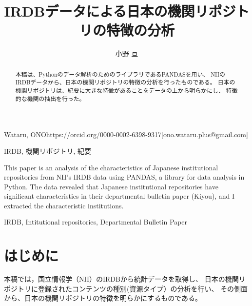 \documentclass[submit,noauthor]{ono}
\begin{document}
\title{IRDBデータによる日本の機関リポジトリの特徴の分析\\}



\author{小野 亘}{Wataru, ONO}{https://orcid.org/0000-0002-6398-9317}[ono.wataru.plus@gmail.com]

\begin{abstract}
本稿は、Pythonのデータ解析のためのライブラリであるPANDASを用い、
NIIのIRDBデータから、日本の機関リポジトリの特徴の分析を行ったものである。
日本の機関リポジトリは、紀要に大きな特徴があることをデータの上から明らかにし、
特徴的な機関の抽出を行った。
\end{abstract}


\begin{jkeyword}
	IRDB, 機関リポジトリ, 紀要
\end{jkeyword}

\begin{eabstract}
This paper is an analysis of the characteristics of Japanese institutional
 repositories from NII's IRDB data using PANDAS, 
 a library for data analysis in Python.
 The data revealed that Japanese institutional repositories have 
 significant characteristics in their departmental bulletin paper (Kiyou), 
 and I extracted the characteristic institutions.
\end{eabstract}

\begin{ekeyword}
	IRDB, Intitutional repositories, Departmental Bulletin Paper
\end{ekeyword}

\maketitle

\section{はじめに}

本稿では，国立情報学（NII）のIRDBから統計データを取得し、
日本の機関リポジトリに登録されたコンテンツの種別(資源タイプ）の分析を行い、
その側面から、日本の機関リポジトリの特徴を明らかにするものである。

\end{document}
